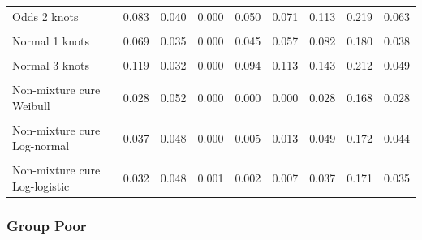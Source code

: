 \documentclass[
]{article}
\begin{document}
\begin{table}[H]
{\begin{tabular}[t]{lrrrrrrrr}
Odds 2 knots & 0.083 & 0.040 & 0.000 & 0.050 & 0.071 & 0.113 & 0.219 & 0.063\\
\cellcolor{gray!10}{Odds 3 knots} & \cellcolor{gray!10}{0.094} & \cellcolor{gray!10}{0.042} & \cellcolor{gray!10}{0.000} & \cellcolor{gray!10}{0.058} & \cellcolor{gray!10}{0.082} & \cellcolor{gray!10}{0.126} & \cellcolor{gray!10}{0.212} & \cellcolor{gray!10}{0.067}\\
Normal 1 knots & 0.069 & 0.035 & 0.000 & 0.045 & 0.057 & 0.082 & 0.180 & 0.038\\
\cellcolor{gray!10}{Normal 2 knots} & \cellcolor{gray!10}{0.093} & \cellcolor{gray!10}{0.032} & \cellcolor{gray!10}{0.000} & \cellcolor{gray!10}{0.068} & \cellcolor{gray!10}{0.085} & \cellcolor{gray!10}{0.116} & \cellcolor{gray!10}{0.201} & \cellcolor{gray!10}{0.048}\\
Normal 3 knots & 0.119 & 0.032 & 0.000 & 0.094 & 0.113 & 0.143 & 0.212 & 0.049\\
\cellcolor{gray!10}{Mixture cure Weibull} & \cellcolor{gray!10}{0.027} & \cellcolor{gray!10}{0.052} & \cellcolor{gray!10}{0.000} & \cellcolor{gray!10}{0.000} & \cellcolor{gray!10}{0.000} & \cellcolor{gray!10}{0.019} & \cellcolor{gray!10}{0.167} & \cellcolor{gray!10}{0.019}\\
Non-mixture cure Weibull & 0.028 & 0.052 & 0.000 & 0.000 & 0.000 & 0.028 & 0.168 & 0.028\\
\cellcolor{gray!10}{Mixture cure Log-normal} & \cellcolor{gray!10}{0.039} & \cellcolor{gray!10}{0.050} & \cellcolor{gray!10}{0.000} & \cellcolor{gray!10}{0.004} & \cellcolor{gray!10}{0.013} & \cellcolor{gray!10}{0.057} & \cellcolor{gray!10}{0.168} & \cellcolor{gray!10}{0.053}\\
Non-mixture cure Log-normal & 0.037 & 0.048 & 0.000 & 0.005 & 0.013 & 0.049 & 0.172 & 0.044\\
\cellcolor{gray!10}{Mixture cure Log-logistic} & \cellcolor{gray!10}{0.034} & \cellcolor{gray!10}{0.049} & \cellcolor{gray!10}{0.001} & \cellcolor{gray!10}{0.003} & \cellcolor{gray!10}{0.009} & \cellcolor{gray!10}{0.042} & \cellcolor{gray!10}{0.171} & \cellcolor{gray!10}{0.039}\\
Non-mixture cure Log-logistic & 0.032 & 0.048 & 0.001 & 0.002 & 0.007 & 0.037 & 0.171 & 0.035\\
\bottomrule
\end{tabular}}
\end{table}

\clearpage

\subsubsection{Group Poor}\label{group-poor}
\end{document}
